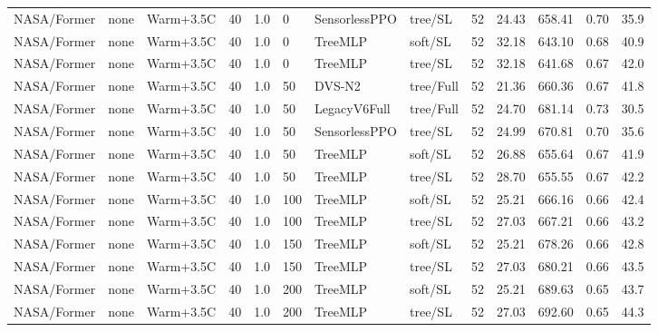 \documentclass[10pt,a4paper]{article}
\begin{document}
\begin{landscape}
\begin{longtable}{llllllllrrrrr}
NASA/Former & none & Warm+3.5C & 40 & 1.0 & 0 & SensorlessPPO & tree/SL & 52 & 24.43 & 658.41 & 0.70 & 35.9 \\

NASA/Former & none & Warm+3.5C & 40 & 1.0 & 0 & TreeMLP & soft/SL & 52 & 32.18 & 643.10 & 0.68 & 40.9 \\

NASA/Former & none & Warm+3.5C & 40 & 1.0 & 0 & TreeMLP & tree/SL & 52 & 32.18 & 641.68 & 0.67 & 42.0 \\

NASA/Former & none & Warm+3.5C & 40 & 1.0 & 50 & DVS-N2 & tree/Full & 52 & 21.36 & 660.36 & 0.67 & 41.8 \\

NASA/Former & none & Warm+3.5C & 40 & 1.0 & 50 & LegacyV6Full & tree/Full & 52 & 24.70 & 681.14 & 0.73 & 30.5 \\

NASA/Former & none & Warm+3.5C & 40 & 1.0 & 50 & SensorlessPPO & tree/SL & 52 & 24.99 & 670.81 & 0.70 & 35.6 \\

NASA/Former & none & Warm+3.5C & 40 & 1.0 & 50 & TreeMLP & soft/SL & 52 & 26.88 & 655.64 & 0.67 & 41.9 \\

NASA/Former & none & Warm+3.5C & 40 & 1.0 & 50 & TreeMLP & tree/SL & 52 & 28.70 & 655.55 & 0.67 & 42.2 \\

NASA/Former & none & Warm+3.5C & 40 & 1.0 & 100 & TreeMLP & soft/SL & 52 & 25.21 & 666.16 & 0.66 & 42.4 \\

NASA/Former & none & Warm+3.5C & 40 & 1.0 & 100 & TreeMLP & tree/SL & 52 & 27.03 & 667.21 & 0.66 & 43.2 \\

NASA/Former & none & Warm+3.5C & 40 & 1.0 & 150 & TreeMLP & soft/SL & 52 & 25.21 & 678.26 & 0.66 & 42.8 \\

NASA/Former & none & Warm+3.5C & 40 & 1.0 & 150 & TreeMLP & tree/SL & 52 & 27.03 & 680.21 & 0.66 & 43.5 \\

NASA/Former & none & Warm+3.5C & 40 & 1.0 & 200 & TreeMLP & soft/SL & 52 & 25.21 & 689.63 & 0.65 & 43.7 \\

NASA/Former & none & Warm+3.5C & 40 & 1.0 & 200 & TreeMLP & tree/SL & 52 & 27.03 & 692.60 & 0.65 & 44.3 \\


\end{longtable}
\end{landscape}
\end{document}
